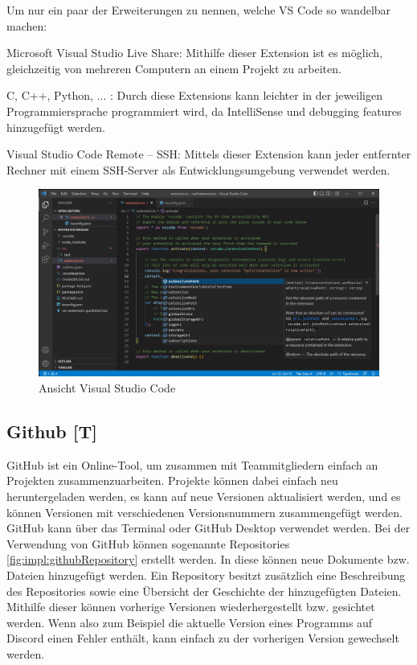 Um nur ein paar der Erweiterungen zu nennen, welche VS Code so wandelbar machen: 

\begin{compactitem}
    \item Microsoft Visual Studio Live Share: Mithilfe dieser Extension ist es möglich, gleichzeitig von mehreren Computern an einem Projekt zu arbeiten.
    \item C, C++, Python, ... : Durch diese Extensions kann leichter in der jeweiligen Programmiersprache programmiert wird, da IntelliSense und debugging features hinzugefügt werden.
    \item Visual Studio Code Remote – SSH: Mittels dieser Extension kann jeder entfernter Rechner mit einem SSH-Server als Entwicklungsumgebung verwendet werden.
\end{compactitem}
\cite{VSCodeOfficialSite}


\begin{figure}[h t]
  \centering
  \includegraphics[scale=0.4]{pics/visualStudioCode.png}
  \caption{Ansicht Visual Studio Code}
  \label{fig:impl:vsCode}
\end{figure}

\subsection{Github [T]} 
GitHub ist ein Online-Tool, um zusammen mit Teammitgliedern einfach an Projekten zusammenzuarbeiten. Projekte können dabei einfach neu heruntergeladen werden, es kann auf neue Versionen aktualisiert werden, und es können Versionen mit verschiedenen Versionsnummern zusammengefügt werden. GitHub kann über das Terminal oder GitHub Desktop verwendet werden. \cite{GitHubOfficialSite}
Bei der Verwendung von GitHub können sogenannte Repositories \ref{fig:impl:githubRepository} erstellt werden. In diese können neue Dokumente bzw. Dateien hinzugefügt werden. Ein Repository besitzt zusätzlich eine Beschreibung des Repositories sowie eine Übersicht der Geschichte der hinzugefügten Dateien. Mithilfe dieser können vorherige Versionen wiederhergestellt bzw. gesichtet werden. Wenn also zum Beispiel die aktuelle Version eines Programms auf Discord einen Fehler enthält, kann einfach zu der vorherigen Version gewechselt werden.

